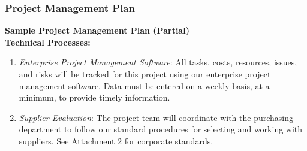 \documentclass[aspectratio=169]{beamer}
\begin{document}
\begin{frame}
\frametitle{Project Management Plan}
\textbf{Sample Project Management Plan (Partial)}\\
\vspace{0.5cm}
\small
\textbf{Technical Processes:}
\begin{enumerate}
\item \textit{Enterprise Project Management Software}: All tasks, costs, resources, issues, and risks will be tracked for this project using our enterprise project management software. Data must be entered on a weekly basis, at a minimum, to provide timely information. 
\item \textit{Supplier Evaluation}: The project team will coordinate with the purchasing department to follow our standard procedures for selecting and working with suppliers. See Attachment 2 for corporate standards.
\end{enumerate}
\end{frame}

\end{document}
